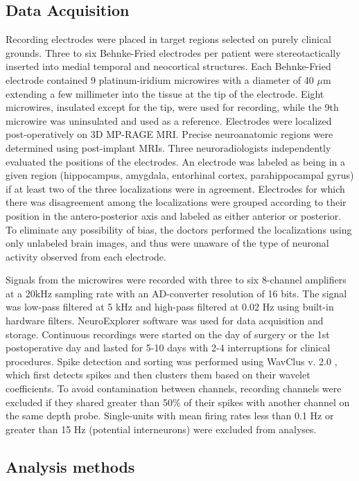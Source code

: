 \subsection*{Data Acquisition}
Recording electrodes were placed in target regions selected on purely clinical grounds. Three to six Behnke-Fried electrodes per patient were stereotactically inserted into medial temporal and neocortical structures. Each Behnke-Fried electrode contained 9 platinum-iridium microwires with a diameter of 40 $\mu$m extending a few millimeter into the tissue at the tip of the electrode. Eight microwires, insulated except for the tip, were used for recording, while the 9th microwire was uninsulated and used as a reference. Electrodes were localized post-operatively on 3D MP-RAGE MRI. Precise neuroanatomic regions were determined using post-implant MRIs. Three neuroradiologists independently evaluated the positions of the electrodes. An electrode was labeled as being in a given region (hippocampus, amygdala, entorhinal cortex, parahippocampal gyrus) if at least two of the three localizations were in agreement. Electrodes for which there was disagreement among the localizations were grouped according to their position in the antero-posterior axis and labeled as either anterior or posterior. To eliminate any possibility of bias, the doctors performed the localizations using only unlabeled brain images, and thus were unaware of the type of neuronal activity observed from each electrode.


Signals from the microwires were recorded with three to six 8-channel amplifiers at a 20kHz sampling rate  with an AD-converter resolution of 16 bits. The signal was low-pass filtered at 5 kHz and high-pass filtered at 0.02 Hz using built-in hardware filters. NeuroExplorer software was used for data acquisition and storage.  Continuous recordings were started on the day of surgery or the 1st postoperative day and lasted for 5-10 days with 2-4 interruptions for clinical procedures. Spike detection and sorting was performed using WavClus v. 2.0 \cite{QuirEtal04}, which first detects spikes and then clusters them based on their wavelet coefficients. To avoid contamination between channels, recording channels were excluded if they shared greater than 50\% of their spikes with another channel on the same depth probe.  Single-units with mean firing rates less than 0.1 Hz or greater than 15 Hz (potential interneurons) were excluded from analyses.

\subsection*{Analysis methods}

